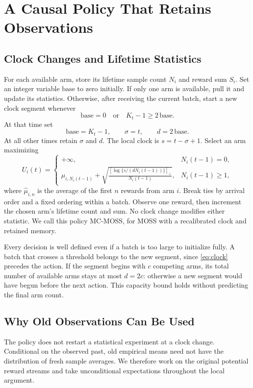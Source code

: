 \section{A Causal Policy That Retains Observations}\label{sec:policy}
\subsection{Clock Changes and Lifetime Statistics}
For each available arm, store its lifetime sample count $N_i$ and reward sum $S_i$. Set an integer variable $\mathrm{base}$ to zero initially. If only one arm is available, pull it and update its statistics. Otherwise, after receiving the current batch, start a new clock segment whenever
\[
 \mathrm{base}=0\quad\text{or}\quad K_t-1\ge2\,\mathrm{base}.
\]
At that time set
\begin{equation}\label{eq:clock}
 \mathrm{base}=K_t-1,\qquad \sigma=t,\qquad d=2\,\mathrm{base}.
\end{equation}
At all other times retain $\sigma$ and $d$. The local clock is $s=t-\sigma+1$. Select an arm maximizing
\begin{equation}\label{eq:index}
 U_i(t)=
 \begin{cases}
 +\infty,&N_i(t-1)=0,\\[1mm]
 \widehat\mu_{i,N_i(t-1)}+
 \displaystyle\sqrt{\frac{[\log\{s/(dN_i(t-1))\}]_+}{N_i(t-1)}},
 &N_i(t-1)\ge1,
 \end{cases}
\end{equation}
where $\widehat\mu_{i,n}$ is the average of the first $n$ rewards from arm $i$. Break ties by arrival order and a fixed ordering within a batch. Observe one reward, then increment the chosen arm's lifetime count and sum. No clock change modifies either statistic. We call this policy MC-MOSS, for MOSS with a recalibrated clock and retained memory.

Every decision is well defined even if a batch is too large to initialize fully. A batch that crosses a threshold belongs to the new segment, since \eqref{eq:clock} precedes the action. If the segment begins with $c$ competing arms, its total number of available arms stays at most $d=2c$: otherwise a new segment would have begun before the next action. This capacity bound holds without predicting the final arm count.

\subsection{Why Old Observations Can Be Used}
The policy does not restart a statistical experiment at a clock change. Conditional on the observed past, old empirical means need not have the distribution of fresh sample averages. We therefore work on the original potential reward streams and take unconditional expectations throughout the local argument.

